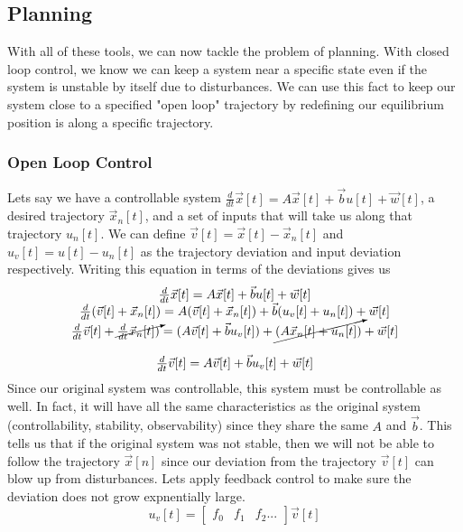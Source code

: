 \documentclass{article}
\begin{document}
\subsection{Planning}
With all of these tools, we can now tackle the problem of planning. With closed loop control, we know we can keep a system near a specific state even if the system is unstable by itself due to disturbances.
We can use this fact to keep our system close to a specified "open loop" trajectory by redefining our equilibrium position is along a specific trajectory.
\subsubsection{Open Loop Control}
Lets say we have a controllable system $\frac{d}{dt} \vec{x}[t]=A\vec{x}[t]+\vec{b}u[t] + \vec{w}[t]$, a desired trajectory $\vec{x}_n[t]$, and a set of inputs that will take us along that trajectory $u_n[t]$.
We can define $\vec{v}[t] = \vec{x}[t]-\vec{x}_n[t]$ and $u_v[t] = u[t] - u_n[t]$ as the trajectory deviation and input deviation respectively.
Writing this equation in terms of the deviations gives us
\[
    \begin{array}{c}
        \frac{d}{dt}\vec{x}[t]=A\vec{x}[t]+\vec{b}u[t]+ \vec{w}[t]\\
        \frac{d}{dt}(\vec{v}[t]+\vec{x}_n[t]) = A(\vec{v}[t] + \vec{x}_n[t]) + \vec{b}(u_v[t] + u_n[t])+ \vec{w}[t]\\
        \frac{d}{dt}\vec{v}[t] + \cancelto{}{\frac{d}{dt}\vec{x}_n[t])} = (A\vec{v}[t] + \vec{b}u_v[t]) + \cancelto{}{(A\vec{x}_n[t] + u_n[t])} + \vec{w}[t]\\\\
        \frac{d}{dt}\vec{v}[t] = A\vec{v}[t]+\vec{b}u_v[t] + \vec{w}[t]
    \end{array}
\]
Since our original system was controllable, this system must be controllable as well. In fact, it will have all the same characteristics as the original system (controllability, stability, observability) since they share the same $A$ and $\vec{b}$.
This tells us that if the original system was not stable, then we will not be able to follow the trajectory $\vec{x}[n]$ since our deviation from the trajectory $\vec{v}[t]$ can blow up from disturbances.
Lets apply feedback control to make sure the deviation does not grow expnentially large.
\[
    u_v[t] = 
    \left[
        \begin{array}{cccc}
            f_0 & f_1 & f_2 ...
        \end{array}
    \right] \vec{v}[t]
\]
\end{document}
